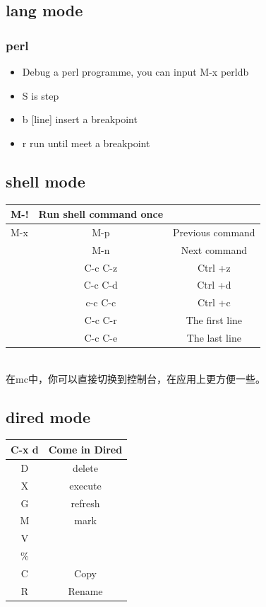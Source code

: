 \documentclass[a4paper,12pt,twoside]{book}
\begin{document}
\begin{CJK*}{UTF8}{song}
\subsection{lang mode}

\subsubsection{perl}
\begin{itemize}
 \item Debug a perl programme, you can input M-x perldb
 \item S   is step
 \item b [line] insert a breakpoint
 \item r run until meet a breakpoint
\end{itemize}

\subsection{shell mode}
\begin{tabular}{|p{}|c|c|}
\hline M-! & Run shell command once & \\
\hline M-x & M-p & Previous command \\ \cline{2-3}
	& M-n & Next command\\ \cline{2-3}
	& C-c C-z & Ctrl +z\\ \cline{2-3}
	& C-c C-d & Ctrl +d\\ \cline{2-3}
	& c-c C-c & Ctrl +c\\ \cline{2-3}
	& C-c C-r & The first line\\ \cline{2-3}
	& C-c C-e & The last line\\ \cline{2-3}
\hline
\end{tabular} \\
在mc中，你可以直接切换到控制台，在应用上更方便一些。

\subsection{dired mode}
\begin{tabular}{|c|c|}
\hline C-x d & Come in Dired\\
\hline D & delete\\
\hline X & execute\\
\hline G & refresh\\
\hline M & mark\\
\hline V & \\
\hline \% & \\
\hline C & Copy\\
\hline R & Rename\\
\hline
\end{tabular}



\end{CJK*}
\end{document}
